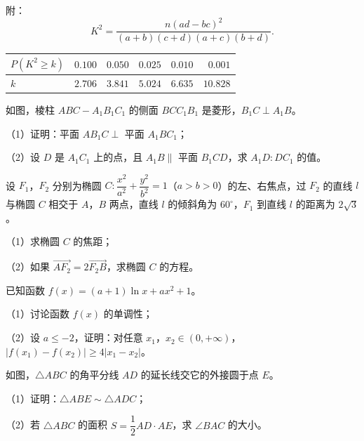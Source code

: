 \begin{question}
附：
\nopagebreak[4]
\[K^2=\frac{n(ad-bc)^2}{(a+b)(c+d)(a+c)(b+d)}.\]

\begin{center}
\begin{tabular}{lrrrrr}
\toprule
$P(K^2\geqslant k)$ & $0.100$ & $0.050$ & $0.025$ & $0.010$ & $0.001$ \\
\midrule
$k$ & $2.706$ & $3.841$ & $5.024$ & $6.635$ & $10.828$ \\
\bottomrule
\end{tabular}
\end{center}

\Needspace{0.4\textheight}
\end{question}
\endgroup
\begingroup
\renewenvironment{question}{\Needspace{0.5\textheight}}{}
\begin{question}
如图，棱柱 $ABC-A_1B_1C_1$ 的侧面 $BCC_1B_1$ 是菱形，$B_1C\perp A_1B$。

（1）证明：平面 $AB_1C\perp$ 平面 $A_1BC_1$；

（2）设 $D$ 是 $A_1C_1$ 上的点，且 $A_1B\parallel$ 平面 $B_1CD$，求 $A_1D:DC_1$ 的值。
\nopagebreak[4]
\begin{center}\end{center}
\nopagebreak[4]
\end{question}
\endgroup
\begin{question}
设 $F_1$，$F_2$ 分别为椭圆 $C:\dfrac{x^2}{a^2}+\dfrac{y^2}{b^2}=1$（$a>b>0$）的左、右焦点，过 $F_2$ 的直线 $l$ 与椭圆 $C$ 相交于 $A$，$B$ 两点，直线 $l$ 的倾斜角为 $60^\circ$，$F_1$ 到直线 $l$ 的距离为 $2\sqrt3$。

（1）求椭圆 $C$ 的焦距；

（2）如果 $\overrightarrow{AF_2}=2\overrightarrow{F_2B}$，求椭圆 $C$ 的方程。

\end{question}
\begin{question}
已知函数 $f(x)=(a+1)\ln x+ax^2+1$。

（1）讨论函数 $f(x)$ 的单调性；

（2）设 $a\leqslant-2$，证明：对任意 $x_1$，$x_2\in(0,+\infty)$，$|f(x_1)-f(x_2)|\geqslant4|x_1-x_2|$。

\Needspace{0.4\textheight}
\end{question}
\begingroup
\renewenvironment{question}{\Needspace{0.5\textheight}}{}
\begin{question}
如图，$\triangle ABC$ 的角平分线 $AD$ 的延长线交它的外接圆于点 $E$。

（1）证明：$\triangle ABE\sim\triangle ADC$；

（2）若 $\triangle ABC$ 的面积 $S=\dfrac12AD\cdot AE$，求 $\angle BAC$ 的大小。
\nopagebreak[4]
\begin{center}\end{center}
\nopagebreak[4]
\end{question}

